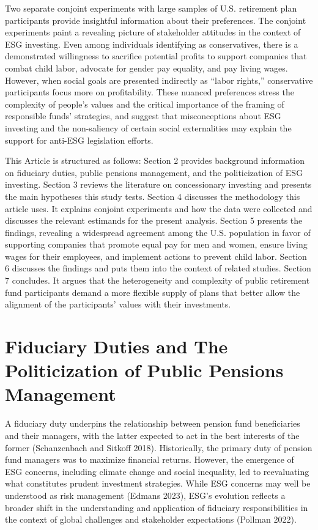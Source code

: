 \documentclass[
  12pt,
]{article}
\begin{document}
Two separate conjoint experiments with large samples of U.S. retirement plan participants provide insightful information about their preferences. The conjoint experiments paint a revealing picture of stakeholder attitudes in the context of ESG investing. Even among individuals identifying as conservatives, there is a demonstrated willingness to sacrifice potential profits to support companies that combat child labor, advocate for gender pay equality, and pay living wages. However, when social goals are presented indirectly as ``labor rights,'' conservative participants focus more on profitability. These nuanced preferences stress the complexity of people's values and the critical importance of the framing of responsible funds' strategies, and suggest that misconceptions about ESG investing and the non-saliency of certain social externalities may explain the support for anti-ESG legislation efforts.

This Article is structured as follows: Section 2 provides background information on fiduciary duties, public pensions management, and the politicization of ESG investing. Section 3 reviews the literature on concessionary investing and presents the main hypotheses this study tests. Section 4 discusses the methodology this article uses. It explains conjoint experiments and how the data were collected and discusses the relevant estimands for the present analysis. Section 5 presents the findings, revealing a widespread agreement among the U.S. population in favor of supporting companies that promote equal pay for men and women, ensure living wages for their employees, and implement actions to prevent child labor. Section 6 discusses the findings and puts them into the context of related studies. Section 7 concludes. It argues that the heterogeneity and complexity of public retirement fund participants demand a more flexible supply of plans that better allow the alignment of the participants' values with their investments.

\hypertarget{fiduciary-duties-and-the-politicization-of-public-pensions-management}{%
\section{Fiduciary Duties and The Politicization of Public Pensions Management}\label{fiduciary-duties-and-the-politicization-of-public-pensions-management}}

A fiduciary duty underpins the relationship between pension fund beneficiaries and their managers, with the latter expected to act in the best interests of the former (Schanzenbach and Sitkoff 2018). Historically, the primary duty of pension fund managers was to maximize financial returns. However, the emergence of ESG concerns, including climate change and social inequality, led to reevaluating what constitutes prudent investment strategies. While ESG concerns may well be understood as risk management (Edmans 2023), ESG's evolution reflects a broader shift in the understanding and application of fiduciary responsibilities in the context of global challenges and stakeholder expectations (Pollman 2022).
\end{document}
